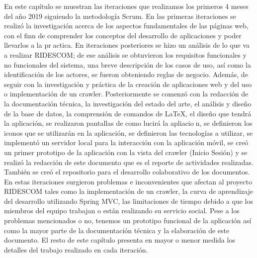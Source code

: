 	\noindent En este capítulo se muestran las iteraciones que realizamos los primeros 4 meses del año 2019 siguiendo la metodología Scrum. En las primeras iteraciones se realizó la investigación acerca de los aspectos fundamentales de las páginas web, con el finn de comprender los conceptos del desarrollo de aplicaciones y poder llevarlos a la practica. En iteraciones posteriores se hizo un análisis de lo que va a realizar RIDESCOM; de ese análisis se obtuvieron los requisitos funcionales y no funcionales del sistema, una breve descripción de los casos de uso, así como la identificación de los actores, se fueron obteniendo reglas de negocio. Además, de seguir con la investigación y práctica de la creación de aplicaciones web y del uso o implementación de un crawler. Posteriormente se comenzó con la redacción de la documentación técnica, la investigación del estado del arte, el análisis y diseño de la base de datos, la comprensión de comandos de LaTeX, el diseño que tendrá la aplicación, se realizaron pantallas de como lucirá la apliacion, se definieron los iconos que se utilizarán en la aplicación, se definieron las tecnologías a utilizar, se implementó un servidor local para la interacción con la aplicación móvil, se creó un primer prototipo de la aplicación con la vista del crawler (Inicio Sesión) y se realizó la redacción de este documento que es el reporte de actividades realizadas. También se creó el repositorio para el desarrollo colaborativo de los documentos. En estas iteraciones surgieron problemas e inconvenientes que afectan al proyecto RIDESCOM tales como la implementación de un crawler, la curva de aprendizaje del desarrollo utilizando Spring MVC, las limitaciones de tiempo debido a que los miembros del equipo trabajan o están realizando su servicio social. Pese a los problemas mencionados o no, tenemos un prototipo funcional de la aplicación así como la mayor parte de la documentación técnica y la elaboración de este documento. El resto de este capítulo presenta en mayor o menor medida los detalles del trabajo realizado en cada iteración.
	
